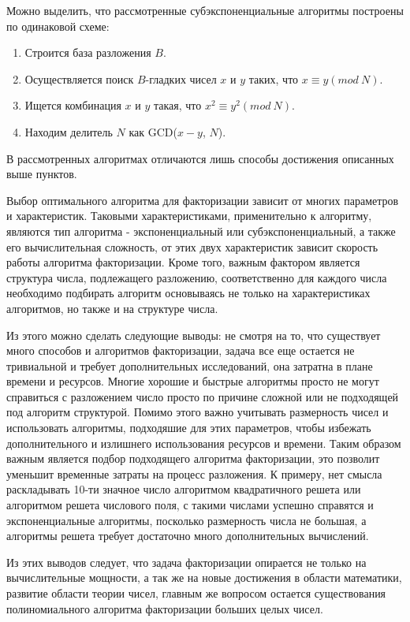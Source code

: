   Можно выделить, что рассмотренные субэкспоненциальные алгоритмы построены по одинаковой схеме:
    \begin{enumerate}
      \item Строится база разложения $B$.
      \item Осуществляется поиск $B$-гладких чисел $x$ и $y$ таких, что $x \equiv y (mod \: N)$.
      \item Ищется комбинация $x$ и $y$ такая, что $x^2 \equiv y^2 (mod \: N)$.
      \item Находим делитель $N$ как GCD($x-y$, $N$).
    \end{enumerate}

  В рассмотренных алгоритмах отличаются лишь способы достижения описанных выше пунктов.
  
  Выбор оптимального алгоритма для факторизации зависит от многих параметров и характеристик. Таковыми характеристиками, применительно к алгоритму, 
  являются тип алгоритма - экспоненциальный или субэкспоненциальный, а также его вычислительная сложность, от этих двух характеристик зависит скорость работы алгоритма факторизации. Кроме того, важным фактором является структура числа, подлежащего разложению, соответственно для каждого числа необходимо подбирать алгоритм основываясь не только на характеристиках алгоритмов, но также и на структуре числа. 

  Из этого можно сделать следующие выводы: не смотря на то, что существует много способов и алгоритмов факторизации, задача все еще остается не тривиальной и требует дополнительных исследований, она затратна в плане времени и ресурсов. Многие хорошие и быстрые алгоритмы просто не могут справиться с разложением число просто по причине сложной или не подходящей под алгоритм структурой. Помимо этого важно учитывать размерность чисел и использовать алгоритмы, подходяшие для этих параметров, чтобы избежать дополнительного и излишнего использования ресурсов и времени. Таким образом важным является подбор подходящего алгоритма факторизации, это позволит уменьшит временные затраты на процесс разложения. К примеру, нет смысла раскладывать 10-ти значное число алгоритмом квадратичного решета или алгоритмом решета числового поля, с такими числами успешно справятся и экспоненциальные алгоритмы, посколько размерность числа не большая, а алгоритмы решета требует достаточно много дополнительных вычислений.

  Из этих выводов следует, что задача факторизации опирается не только на вычислительные мощности, а так же на новые достижения в области математики, развитие области теории чисел, главным же вопросом остается существования полиномиального алгоритма факторизации больших целых чисел.

